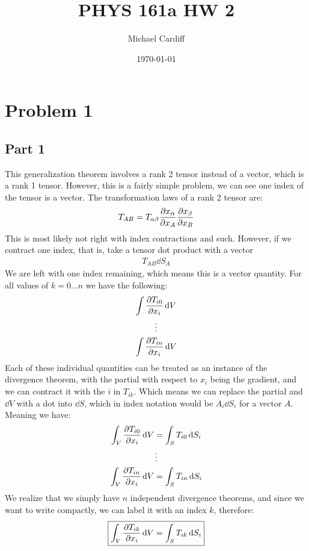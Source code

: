 \documentclass[12pt]{article}
\title{\vspace{-3em}PHYS 161a HW 2}
\author{Michael Cardiff}
\date{\today}
\begin{document}
\maketitle
\section*{Problem 1}
\subsection*{Part 1}
This generalization theorem involves a rank 2 tensor instead of a vector, which is a rank 1 tensor. However, this is a fairly simple problem, we can see one index of the tensor is a vector. The transformation laws of a rank 2 tensor are:
\begin{align*}
  T_{AB}=T_{\alpha\beta}\pdv{x_\alpha}{x_A}\pdv{x_\beta}{x_B}
\end{align*}
This is most likely not right with index contractions and such. However, if we contract one index, that is, take a tensor dot product with a vector
\begin{align*}
  T_{AB}\dd{S}_A
\end{align*}
We are left with one index remaining, which means this is a vector quantity. For all values of $k=0...n$ we have the following:
\begin{gather*}
  \int\pdv{T_{i0}}{x_i}\dd{V}\\
  \vdots\\
  \int\pdv{T_{in}}{x_i}\dd{V}
\end{gather*}
Each of these individual quantities can be treated as an instance of the divergence theorem, with the partial with respect to $x_i$ being the gradient, and we can contract it with the $i$ in  $T_{ik}$. Which means we can replace the partial and $\dd{V}$ with a dot into $\dd{S}$, which in index notation would be $A_i\dd{S_i}$ for a vector $A$. Meaning we have:
\begin{gather*}
  \int_V\pdv{T_{i0}}{x_i}\dd{V}=\int_S T_{i0}\dd{S_i}\\
  \vdots\\
  \int_V\pdv{T_{in}}{x_i}\dd{V}=\int_S T_{in}\dd{S_i}
\end{gather*}
We realize that we simply have $n$ independent divergence theorems, and since we want to write compactly, we can label it with an index $k$, therefore:
\begin{gather}
  \boxed{\int_V\pdv{T_{ik}}{x_i}\dd{V}=\int_S T_{ik}\dd{S_i}}
\end{gather}
\end{document}
